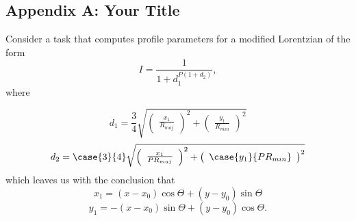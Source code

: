 \begin{article}

\appendix
\section{Appendix A: Your Title}




Consider a task that computes profile parameters for 
a modified Lorentzian of the form
\begin{equation}
   I = \frac{1}{1 + d_{1}^{P (1 + d_{2} )}}, 
\end{equation}
where
\begin{mathletters}
\begin{equation}
   d_{1} = \frac{3}{4} \sqrt{ \left( \begin{array}{c} 
           \frac{x_{1}}{R_{maj}} 
   \end{array} \right) ^{2} + \left( \begin{array}{c} 
           \frac{y_{1}}{R_{min}} 
   \end{array} \right) ^{2} } 
\end{equation}
\begin{equation}
   d_{2} = \case{3}{4} \sqrt{ \left( \begin{array}{c} 
           \frac{x_{1}}{P R_{maj}}
   \end{array} \right) ^{2} + \left( \begin{array}{c} 
           \case{y_{1}}{P R_{min}} 
   \end{array} \right) ^{2} }  
\end{equation}
which leaves us with the conclusion that
\begin{equation}
   x_{1} = (x - x_{0}) \cos \Theta 
   + (y - y_{0}) \sin \Theta 
\end{equation}
\begin{equation}
   y_{1} = -(x - x_{0}) \sin \Theta 
   + (y - y_{0}) \cos \Theta. 
\end{equation}
\end{mathletters}


\end{article}

